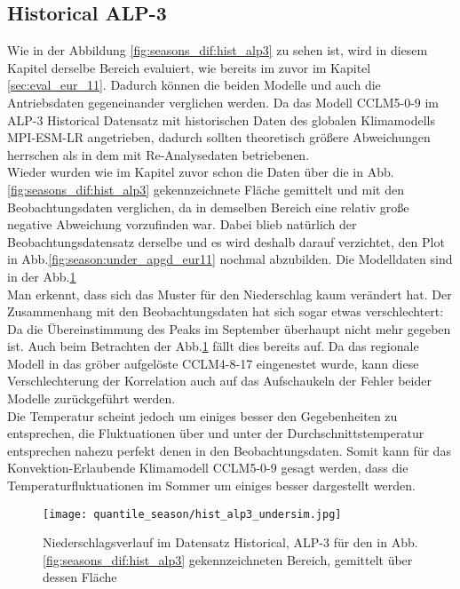 \subsection{Historical ALP-3}
Wie in der Abbildung \ref{fig:seasons_dif:hist_alp3} zu sehen ist, wird in diesem Kapitel derselbe Bereich evaluiert, wie bereits im zuvor im Kapitel \ref{sec:eval_eur_11}. Dadurch können die beiden Modelle und auch die Antriebsdaten gegeneinander verglichen werden. Da das Modell CCLM5-0-9 im ALP-3 Historical Datensatz mit historischen Daten des globalen Klimamodells MPI-ESM-LR angetrieben, dadurch sollten theoretisch größere Abweichungen herrschen als in dem mit Re-Analysedaten betriebenen.\\
Wieder wurden wie im Kapitel zuvor schon die Daten über die in Abb.\ref{fig:seasons_dif:hist_alp3} gekennzeichnete Fläche gemittelt und mit den Beobachtungsdaten verglichen, da in demselben Bereich eine relativ große negative Abweichung vorzufinden war. Dabei blieb natürlich der Beobachtungsdatensatz derselbe und es wird deshalb darauf verzichtet, den Plot in Abb.\ref{fig:season:under_apgd_eur11} nochmal abzubilden. Die Modelldaten sind in der Abb.\ref{fig:season:under_hist_alp3}\\
Man erkennt, dass sich das Muster für den Niederschlag kaum verändert hat. Der Zusammenhang mit den Beobachtungsdaten hat sich sogar etwas verschlechtert: Da die Übereinstimmung des Peaks im September überhaupt nicht mehr gegeben ist. Auch beim Betrachten der Abb.\ref{fig:season:under_hist_alp3} fällt dies bereits auf. Da das regionale Modell in das gröber aufgelöste CCLM4-8-17 eingenestet wurde, kann diese Verschlechterung der Korrelation auch auf das Aufschaukeln der Fehler beider Modelle zurückgeführt werden.\\
Die Temperatur scheint jedoch um einiges besser den Gegebenheiten zu entsprechen, die Fluktuationen über und unter der Durchschnittstemperatur entsprechen nahezu perfekt denen in den Beobachtungsdaten. Somit kann für das Konvektion-Erlaubende Klimamodell CCLM5-0-9 gesagt werden, dass die Temperaturfluktuationen im Sommer um einiges besser dargestellt werden.
\begin{figure}[h!]
	\texttt{[image: quantile\_season/hist\_alp3\_undersim.jpg]}
	\caption{Niederschlagsverlauf im Datensatz Historical, ALP-3 für den in Abb.\ref{fig:seasons_dif:hist_alp3} gekennzeichneten Bereich, gemittelt über dessen Fläche}
	\label{fig:season:under_hist_alp3}
\end{figure}
